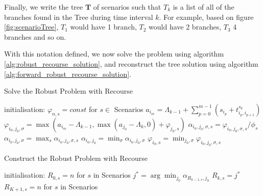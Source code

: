 Finally, we write the tree $\mathbf{T}$ of scenarios such that $T_k$ is a list of all of the branches found in the Tree during time interval $k$. For example, based on figure \ref{fig:scenarioTree}, $T_1$ would have 1 branch, $T_2$ would have 2 branches, $T_3$ 4 branches and so on. 

With this notation defined, we now solve the problem using algorithm \ref{alg:robust_recourse_solution}, and reconstruct the tree solution using algorithm \ref{alg:forward_robust_recourse_solution}. 

\begin{algorithm} %
	\caption{Solve the Robust Problem with Recourse}
	\label{alg:robust_recourse_solution} %
	\begin{algorithmic} %
		\STATE initialisation: $\varphi_{n, s} = const$ for $s \in $ Scenarios
		\STATE $a_{i_m}=\Lambda_{k-1}+\sum_{p=0}^{m-1}\left(s_{i_p}+t^{s_k}_{i_{p},i_{p+1}}\right)$
		\STATE 
		$\varphi_{i_0,j_0,\sigma}=\max(a_{i_m}-\Lambda_{k-1}, \max(a_{j_0} - \Lambda_k,0) + \varphi_{j_0, s})$
		\STATE $\alpha_{i_0,j_0,\sigma,s } = \varphi_{i_0,j_0,\sigma, s}/\phi_s$
		\ENDFOR
		\STATE $\alpha_{i_0, j_0, \sigma} = \max_s \alpha_{i_0, j_0, \sigma, s}$
		\ENDFOR
		\STATE $ \alpha_{i_0,j_0}=\min_{\sigma}\alpha_{i_0,j_0, \sigma}$
		\ENDFOR
		\STATE $\varphi_{i_0, s} = \min_{j_0, \sigma}\varphi_{i_0,j_0,\sigma, s }$
		\ENDFOR
		\ENDFOR
		\ENDFOR
		\ENDFOR			
	\end{algorithmic}
\end{algorithm}

\begin{algorithm} %
	\caption{Construct the Robust Problem with Recourse}
	\label{alg:forward_robust_recourse_solution} %
	\begin{algorithmic} %
		\STATE initialisation: $R_{0,s} = n$ for $s$ in Scenarios
		\STATE $j^* = \arg\min_{j_0}\alpha_{R_{k-1, s}, j_0} $
		\STATE $R_{k,s} = j^*$
		\ENDFOR
		\ENDFOR
		\STATE $R_{K+1, s} = n$ for $s$ in Scenarios
	\end{algorithmic}
\end{algorithm}


